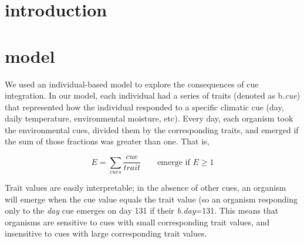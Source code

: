 \documentclass[11pt,a4paper]{article}
\begin{document}
\section{introduction}
\section{model}
We used an individual-based model to explore the consequences of cue integration. In our model, each individual had a series of traits (denoted as b.\textit{cue}) that represented how the individual responded to a specific climatic cue (day, daily temperature, environmental moisture, etc). Every day, each organism took the environmental cues, divided them by the corresponding traits, and emerged if the sum of those fractions was greater than one. That is,

\[ E=\sum_{cues} \frac{cue}{trait} \quad \quad \text{emerge if }E \ge 1\]

Trait values are easily interpretable; in the absence of other cues, an organism will emerge when the cue value equals the trait value (so an organism responding only to the \textit{day} cue emerges on day 131 if their \textit{b.day}=131. This means that organisms are sensitive to cues with small corresponding trait values, and insensitive to cues with large corresponding trait values.
\end{document}
